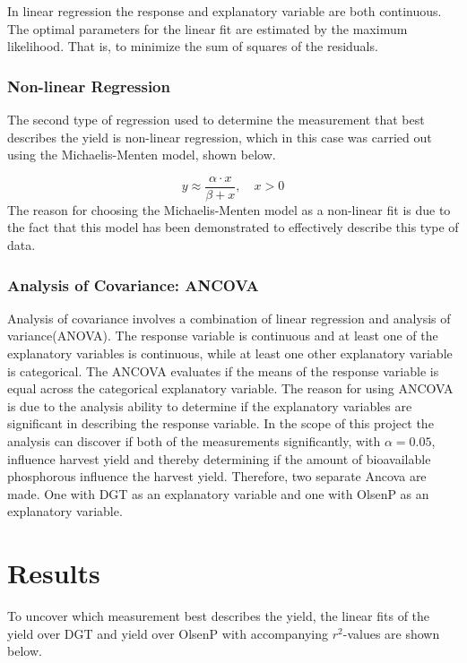 \documentclass[11pt, fleqn, titlepage]{article}
\begin{document}
\noindent
In linear regression the response and explanatory variable are both continuous. The optimal parameters for the linear fit are estimated by the maximum likelihood. That is, to minimize the sum of squares of the residuals. \cite{statbog} 

\subsubsection*{Non-linear Regression}
The second type of regression used to determine the measurement that best describes the yield is non-linear regression, which in this case was carried out using the Michaelis-Menten model, shown below.

\[y \approx \frac{\alpha \cdot x}{\beta + x}, \quad x > 0 \]
\noindent
The reason for choosing the Michaelis-Menten model as a non-linear fit is due to the fact that this model has been demonstrated to effectively describe this type of data. 

\subsubsection*{Analysis of Covariance: ANCOVA}
Analysis of covariance involves a combination of linear regression and analysis of variance(ANOVA). The response variable is continuous and at least one of the explanatory variables is continuous, while at least one other explanatory variable is categorical. The ANCOVA evaluates if the means of the response variable is equal across the categorical explanatory variable. The reason for using ANCOVA is due to the analysis ability to determine if the explanatory variables are significant in describing the response variable. In the scope of this project the analysis can discover if both of the measurements significantly, with $ \alpha = 0.05 $, influence harvest yield and thereby determining if the amount of bioavailable phosphorous influence the harvest yield. Therefore, two separate Ancova are made. One with DGT as an explanatory variable and one with OlsenP as an explanatory variable.   \cite{statbog} 


\section{Results}

To uncover which measurement best describes the yield, the linear fits of the yield over DGT and yield over OlsenP with accompanying $r^2$-values are shown below.
\end{document}

